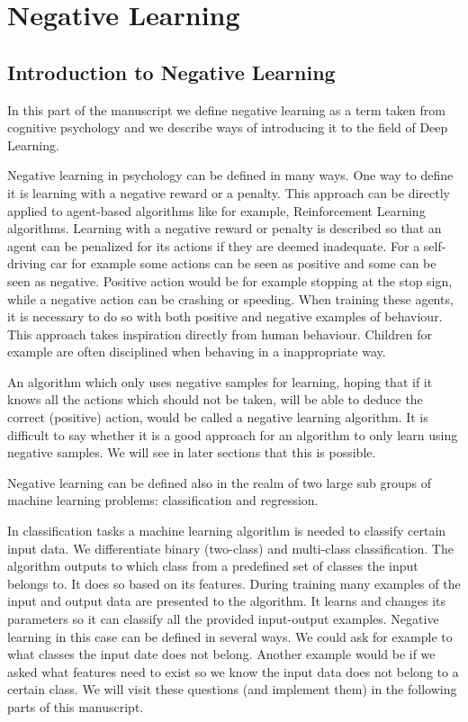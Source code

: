 \documentclass[b5paper]{book}
\begin{document}
\part{Negative Learning}
\chapter{Introduction to Negative Learning}

In this part of the manuscript we define negative learning as a term taken from cognitive psychology and we describe ways of introducing it to the field of Deep Learning.

Negative learning in psychology can be defined in many ways. One way to define it is learning with a negative reward or a penalty. This approach can be directly applied to agent-based algorithms like for example, Reinforcement Learning algorithms. Learning with a negative reward or penalty is described so that an agent can be penalized for its actions if they are deemed inadequate. For a self-driving car for example some actions can be seen as positive and some can be seen as negative. Positive action would be for example stopping at the stop sign, while a negative action can be crashing or speeding. When training these agents, it is necessary to do so with both positive and negative examples of behaviour. This approach takes inspiration directly from human behaviour. Children for example are often disciplined when behaving in a inappropriate way.

An algorithm which only uses negative samples for learning, hoping that if it knows all the actions which should not be taken, will be able to deduce the correct (positive) action, would be called a negative learning algorithm. It is difficult to say whether it is a good approach for an algorithm to only learn using negative samples. We will see in later sections that this is possible.

Negative learning can be defined also in the realm of two large sub groups of machine learning problems: classification and regression.

In classification tasks a machine learning algorithm is needed to classify certain input data. We differentiate binary (two-class) and multi-class classification. The algorithm outputs to which class from a predefined set of classes the input belongs to. It does so based on its features. During training many examples of the input and output data are presented to the algorithm. It learns and changes its parameters so it can classify all the provided input-output examples. Negative learning in this case can be defined in several ways. We could ask for example to what classes the input date does not belong. Another example would be if we asked what features need to exist so we know the input data does not belong to a certain class. We will visit these questions (and implement them) in the following parts of this manuscript.
\end{document}
